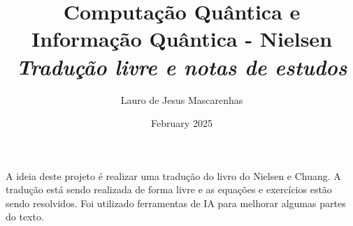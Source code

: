 \documentclass[a4paper, 10pt]{book}
\title{
    \Huge\bf Computação Quântica e Informação Quântica - Nielsen \\
    {\large\it Tradução livre e notas de estudos}
}
\author{Lauro de Jesus Mascarenhas}
\date{February 2025}
\begin{document}
\maketitle

\tableofcontents

\chapter*{}
A ideia deste projeto é realizar uma tradução do livro do Nielsen e 
Chuang. A tradução está sendo realizada de forma livre e as equações e
exercícios estão sendo resolvidos. Foi utilizado ferramentas de IA para
melhorar algumas partes do texto.

\end{document}
